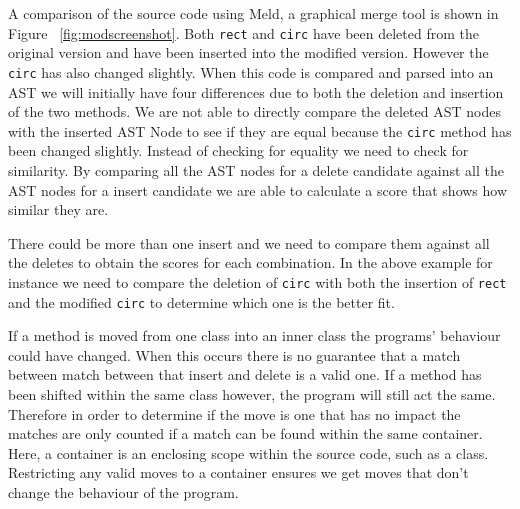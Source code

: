 A comparison of the source code using Meld, a graphical merge tool is shown in Figure ~\ref{fig:modscreenshot}.
Both \lstinline{rect} and \lstinline{circ} have been deleted from the original version and have been inserted into the modified version.  
However the \lstinline{circ} has also changed slightly. 
When this code is compared and parsed into an AST we will initially have four differences due to both the deletion and insertion of the two methods.    
We are not able to directly compare the deleted AST nodes with the inserted AST Node to see if they are equal because the \lstinline{circ} method has been changed slightly. 
Instead of checking for equality we need to check for similarity.
By comparing all the AST nodes for a delete candidate against all the AST nodes for a insert candidate we are able to calculate a score that shows how similar they are.

There could be more than one insert and we need to compare them against all the deletes to obtain the scores for each combination.
In the above example for instance we need to compare the deletion of \lstinline{circ} with both the insertion of \lstinline{rect} and the modified \lstinline{circ} to determine which one is the better fit.

If a method is moved from one class into an inner class the programs' behaviour could have changed. 
When this occurs there is no guarantee that a match between match between that insert and delete is a valid one.
If a method has been shifted within the same class however, the program will still act the same.  
Therefore in order to determine if the move is one that has no impact the matches are only counted if a match can be found within the same container.  
Here, a container is an enclosing scope within the source code, such as a class. 
Restricting any valid moves to a container ensures we get moves that don't change the behaviour of the program.

% 

